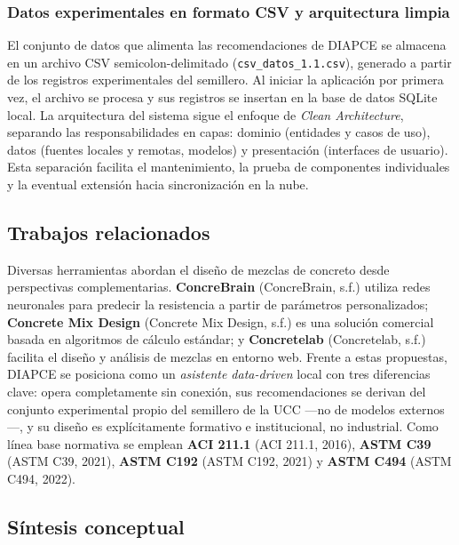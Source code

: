 \subsubsection*{Datos experimentales en formato CSV y arquitectura limpia}

El conjunto de datos que alimenta las recomendaciones de DIAPCE se almacena en un archivo CSV semicolon-delimitado (\texttt{csv\_datos\_1.1.csv}), generado a partir de los registros experimentales del semillero. Al iniciar la aplicación por primera vez, el archivo se procesa y sus registros se insertan en la base de datos SQLite local. La arquitectura del sistema sigue el enfoque de \textit{Clean Architecture}, separando las responsabilidades en capas: dominio (entidades y casos de uso), datos (fuentes locales y remotas, modelos) y presentación (interfaces de usuario). Esta separación facilita el mantenimiento, la prueba de componentes individuales y la eventual extensión hacia sincronización en la nube.

\subsection{Trabajos relacionados}

Diversas herramientas abordan el diseño de mezclas de concreto desde perspectivas complementarias. \textbf{ConcreBrain} (ConcreBrain, s.f.) utiliza redes neuronales para predecir la resistencia a partir de parámetros personalizados; \textbf{Concrete Mix Design} (Concrete Mix Design, s.f.) es una solución comercial basada en algoritmos de cálculo estándar; y \textbf{Concretelab} (Concretelab, s.f.) facilita el diseño y análisis de mezclas en entorno web. Frente a estas propuestas, DIAPCE se posiciona como un \textit{asistente data-driven} local con tres diferencias clave: opera completamente sin conexión, sus recomendaciones se derivan del conjunto experimental propio del semillero de la UCC —no de modelos externos—, y su diseño es explícitamente formativo e institucional, no industrial. Como línea base normativa se emplean \textbf{ACI 211.1} (ACI 211.1, 2016), \textbf{ASTM C39} (ASTM C39, 2021), \textbf{ASTM C192} (ASTM C192, 2021) y \textbf{ASTM C494} (ASTM C494, 2022).

\subsection{Síntesis conceptual}

